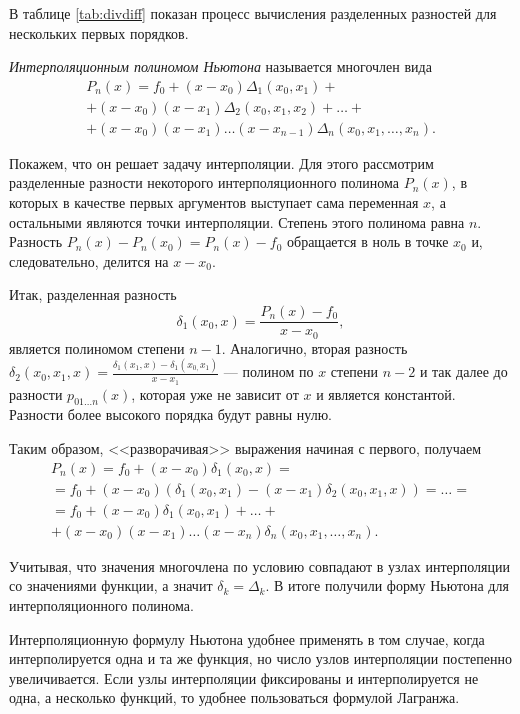 В таблице \ref{tab:divdiff} показан процесс вычисления разделенных
разностей для нескольких первых порядков.

\emph{Интерполяционным полиномом Ньютона} называется многочлен вида
\begin{multline*}
P_{n}(x)=f_{0}+(x-x_{0})\Delta_{1}(x_{0},x_{1})+\\
+(x-x_{0})(x-x_{1})\Delta_{2}(x_{0},x_{1},x_{2})+\dots+\\
+(x-x_{0})(x-x_{1})\dots(x-x_{n-1})\Delta_{n}(x_{0},x_{1},\dots,x_{n}).
\end{multline*}


Покажем, что он решает задачу интерполяции. Для этого рассмотрим
разделенные разности некоторого интерполяционного полинома $P_{n}(x)$,
в которых в качестве первых аргументов выступает сама переменная $x$,
а остальными являются точки интерполяции. Степень этого полинома равна
$n$. Разность $P_{n}(x)-P_{n}(x_{0})=P_{n}(x)-f_{0}$ обращается в ноль
в точке $x_{0}$ и, следовательно, делится на $x-x_{0}$.

Итак, разделенная разность
\[
\delta_{1}(x_{0},x)=\frac{P_{n}(x)-f_{0}}{x-x_{0}},
\]
является полиномом степени $n-1$. Аналогично, вторая разность
$\delta_{2}(x_{0},x_{1},x)=\frac{\delta_{1}(x_{1},x)-\delta_{1}(x_{0,}x_{1})}{x-x_{1}}$
--- полином по $x$ степени $n-2$ и так далее до разности $p_{01\dots
  n}(x)$, которая уже не зависит от $x$ и является
константой. Разности более высокого порядка будут равны нулю.

Таким образом, <<разворачивая>> выражения начиная с первого, получаем
\begin{multline*}
P_{n}(x)=f_{0}+(x-x_{0})\delta_{1}(x_{0},x)=\\
=f_{0}+(x-x_{0})\left(\delta_{1}(x_{0},x_{1})-(x-x_{1})\delta_{2}(x_{0},x_{1},x)\right)=\dots=\\
=f_{0}+(x-x_{0})\delta_{1}(x_{0},x_{1})+\dots+\\
+(x-x_{0})(x-x_{1})\dots(x-x_{n})\delta_{n}(x_{0},x_{1},\dots,x_{n}).
\end{multline*}


Учитывая, что значения многочлена по условию совпадают в узлах
интерполяции со значениями функции, а значит
$\delta_{k}=\Delta_{k}$. В итоге получили форму Ньютона для
интерполяционного полинома.

Интерполяционную формулу Ньютона удобнее применять в том случае, когда
интерполируется одна и та же функция, но число узлов интерполяции
постепенно увеличивается. Если узлы интерполяции фиксированы и
интерполируется не одна, а несколько функций, то удобнее пользоваться
формулой Лагранжа.

